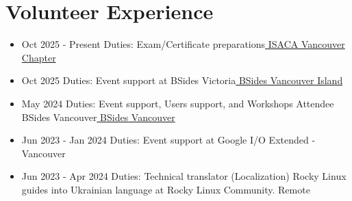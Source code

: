\documentclass[11pt,oneside,a4paper,titlepage,pdfusetitle]{article}
\begin{document}
{\begin{minipage}{7.3cm}
\begin{itemize}[left=1pt]
    \end{itemize}



    \section{Volunteer Experience}
    \begin{itemize}[left=0pt]
        \item {Oct 2025 - Present} {Duties: Exam/Certificate preparations}\href{https://engage.isaca.org/vancouverchapter/home }{ ISACA Vancouver Chapter}
        \vspace*{0.22cm}
        \item {Oct 2025} {Duties: Event support at BSides Victoria}\href{https://www.bsidesvi.com/ }{ BSides Vancouver Island}
        \vspace*{0.22cm}
        \item {May 2024} {Duties: Event support, Users support, and Workshops Attendee BSides Vancouver}\href{https://www.bsidesvancouver.com/}{ BSides Vancouver}
        \vspace*{0.22cm}
        \item {Jun 2023 - Jan 2024} {Duties: Event support at Google I/O Extended - Vancouver}
        \vspace*{0.22cm}
        \item {Jun 2023 - Apr 2024 } {Duties: Technical translator (Localization) Rocky Linux guides into Ukrainian language at Rocky Linux Community. Remote}
        \vspace*{0.22cm}
        
    \end{itemize}

\end{minipage}}
\end{document}
